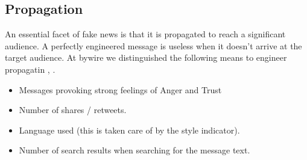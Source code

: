 \documentclass[10pt, a4paper, twocolumn]{article} %
\begin{document}
\subsection{Propagation}
An essential facet of fake news is that it is propagated to reach a significant audience. A perfectly engineered message is useless when it doesn't arrive at the target audience. At bywire we distinguished the following means to engineer propagatin \cite{vosoughi2018}, \cite{sivek2019}.
\begin{itemize}
\item Messages provoking strong feelings of Anger and Trust
\item Number of shares / retweets.
\item Language used (this is taken care of by the style indicator).
\item Number of search results when searching for the message text.
\end{itemize}
\end{document}
